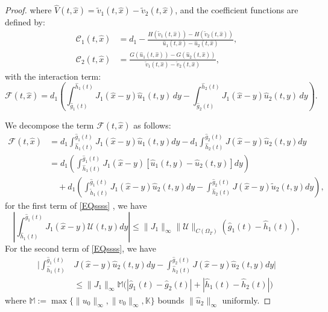 \documentclass[a4paper,11pt]{amsart}
\theoremstyle{definition}
\numberwithin{equation}{section}
\theoremstyle{definition}
\begin{document}
\begin{proof}
where $\hat{V}(t, \hat{x}) = \widetilde{v}_1(t, \hat{x}) - \widetilde{v}_2(t, \hat{x})$, and the coefficient functions are defined by:
\begin{equation}\label{eq:coefficients}
\begin{aligned}
\mathcal{C}_1(t,\hat{x}) &= d_1 - \frac{H(\widetilde{v}_1(t, \hat{x}))- H(\widetilde{v}_2(t, \hat{x}))}{\hat{u}_1(t,\hat{x}) - \hat{u}_2(t,\hat{x})}, \\
\mathcal{C}_2(t,\hat{x}) &= \frac{G(\hat{u}_1(t,\hat{x})) - G(\hat{u}_2(t,\hat{x}))}{\widetilde{v}_1(t,\hat{x}) - \widetilde{v}_2(t,\hat{x})},
\end{aligned}
\end{equation}
with the interaction term:
\begin{equation}\label{eq:I_term}
\mathcal{F}(t, \hat{x}) = d_1\left(\int_{\hat{g}_1(t)}^{\hat{h}_1(t)} J_1(\hat{x}-y)\hat{u}_1(t,y)\,dy - \int_{\hat{g}_2(t)}^{\hat{h}_2(t)} J_1(\hat{x}-y)\hat{u}_2(t,y)\,dy\right).
\end{equation}

We decompose the term $\mathcal{F}\left(t, \hat{x}\right)$ as follows:
\begin{equation}\label{EQssss}
\begin{aligned}
\mathcal{F}\left(t, \hat{x}\right) &= d_1 \displaystyle\int_{\hat{h}_1(t)}^{\hat{g}_1(t)} J_1(\hat{x}-y)\hat{u}_1(t,y)dy - d_1 \displaystyle\int_{\hat{h}_2(t)}^{\hat{g}_2(t)} J(\hat{x}-y)\hat{u}_2(t,y)dy \\
&= d_1 \left( \displaystyle\int_{\hat{h}_1(t)}^{\hat{g}_1(t)} J_1(\hat{x}-y)[\hat{u}_1(t,y) - \hat{u}_2(t,y)]dy \right) \\
&\quad + d_1 \left( \int_{\tilde{h}_1(t)}^{\hat{g}_1(t)} J_1(\hat{x}-y)\hat{u}_2(t,y)dy - \displaystyle\int_{\hat{h}_2(t)}^{\hat{g}_2(t)} J(\hat{x}-y)\tilde{u}_2(t,y)dy \right),
\end{aligned}
\end{equation}
for the first term of \eqref{EQssss} , we have
\begin{equation}\label{EQBOUD1}
\left| \displaystyle\int_{\hat{h}_1(t)}^{\hat{g}_1(t)} J_1(\hat{x}-y)\mathcal{U}(t,y)dy \right| \leq \|J_1\|_\infty \|\mathcal{U}\|_{C(\Omega_T)} (\hat{g}_1(t) - \hat{h}_1(t)),
\end{equation}
For the second term of \eqref{EQssss}, we have
\begin{equation}\label{EQBOUD2}
\begin{aligned}
\bigg| \int_{\hat{h}_1(t)}^{\hat{g}_1(t)} &J(\hat{x}-y)\hat{u}_2(t,y)dy - \int_{\hat{h}_2(t)}^{\hat{g}_2(t)} J(\hat{x}-y)\hat{u}_2(t,y)dy \bigg| \\
&\leq \|J_1\|_{\infty} \mathbb{M} \big( |\hat{g}_1(t) - \hat{g}_2(t)| + |\hat{h}_1(t) - \hat{h}_2(t)| \big)
\end{aligned}
\end{equation}
where $\mathbb{M} := \max\{\|u_0\|_{\infty}, \|v_0\|_{\infty}, \mathbb{K}\}$ bounds $\|\hat{u}_2\|_{\infty}$ uniformly.


\end{proof}
\end{document}
